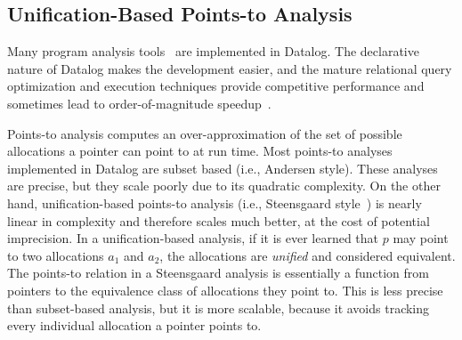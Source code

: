\subsection{Unification-Based Points-to Analysis}
\label{sec:points-to}

Many program analysis tools~\citep{bddbddb, cclyzer, doop}
 are implemented in Datalog.
The declarative nature of Datalog makes the development easier,
 and the mature relational query optimization and execution techniques
 provide competitive performance and
 sometimes lead to order-of-magnitude speedup~\citep{doop}.

Points-to analysis
 computes an over-approximation of 
 the set of possible allocations a pointer can point to at run time.
Most points-to analyses implemented in Datalog 
 are subset based (i.e., Andersen style).
These analyses are precise, 
 but they scale poorly due to its quadratic complexity.
On the other hand, 
 unification-based points-to analysis (i.e., Steensgaard style~\cite{DBLP:conf/popl/Steensgaard96})
 is nearly linear in complexity
 and therefore scales much better,
 at the cost of potential imprecision.
In a unification-based analysis,
 if it is ever learned that $p$ 
 may point to two allocations $a_1$ and $a_2$,
 the allocations are \emph{unified} and considered equivalent.
The points-to relation in a Steensgaard analysis
 is essentially a function from pointers to the equivalence class of allocations
 they point to.
This is less precise than subset-based analysis,
 but it is more scalable, 
 because it avoids tracking every individual allocation a pointer points to.

